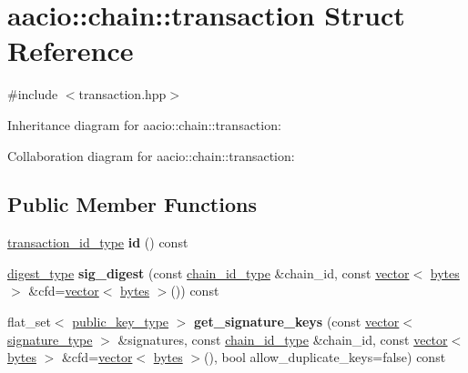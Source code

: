 \hypertarget{structaacio_1_1chain_1_1transaction}{}\section{aacio\+:\+:chain\+:\+:transaction Struct Reference}
\label{structaacio_1_1chain_1_1transaction}


{\ttfamily \#include $<$transaction.\+hpp$>$}



Inheritance diagram for aacio\+:\+:chain\+:\+:transaction\+:


Collaboration diagram for aacio\+:\+:chain\+:\+:transaction\+:
\subsection*{Public Member Functions}
\begin{DoxyCompactItemize}
\item 
\mbox{\label{structaacio_1_1chain_1_1transaction_a62a6e2a86741915f09396161ed50551c}} 
\mbox{\hyperlink{classfc_1_1sha256}{transaction\+\_\+id\+\_\+type}} {\bfseries id} () const
\item 
\mbox{\label{structaacio_1_1chain_1_1transaction_a1242fe0aa21d7aa260f1b7fc26b9aade}} 
\mbox{\hyperlink{classfc_1_1sha256}{digest\+\_\+type}} {\bfseries sig\+\_\+digest} (const \mbox{\hyperlink{classfc_1_1sha256}{chain\+\_\+id\+\_\+type}} \&chain\+\_\+id, const \mbox{\hyperlink{classstd_1_1vector}{vector}}$<$ \mbox{\hyperlink{classstd_1_1vector}{bytes}} $>$ \&cfd=\mbox{\hyperlink{classstd_1_1vector}{vector}}$<$ \mbox{\hyperlink{classstd_1_1vector}{bytes}} $>$()) const
\item 
\mbox{\label{structaacio_1_1chain_1_1transaction_aef4553781b8a8b5714daa77d439771fa}} 
flat\+\_\+set$<$ \mbox{\hyperlink{classfc_1_1crypto_1_1public__key}{public\+\_\+key\+\_\+type}} $>$ {\bfseries get\+\_\+signature\+\_\+keys} (const \mbox{\hyperlink{classstd_1_1vector}{vector}}$<$ \mbox{\hyperlink{classfc_1_1crypto_1_1signature}{signature\+\_\+type}} $>$ \&signatures, const \mbox{\hyperlink{classfc_1_1sha256}{chain\+\_\+id\+\_\+type}} \&chain\+\_\+id, const \mbox{\hyperlink{classstd_1_1vector}{vector}}$<$ \mbox{\hyperlink{classstd_1_1vector}{bytes}} $>$ \&cfd=\mbox{\hyperlink{classstd_1_1vector}{vector}}$<$ \mbox{\hyperlink{classstd_1_1vector}{bytes}} $>$(), bool allow\+\_\+duplicate\+\_\+keys=false) const
\end{DoxyCompactItemize}
